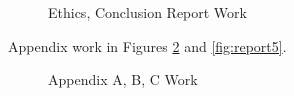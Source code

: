 \documentclass[11pt, a4, nocenter, margin=150mm]{article}
\begin{document}
\begin{appendices}
	\begin{figure}[h!]
		\centering
		\caption{Ethics, Conclusion Report Work}
		\label{fig:report3}
	\end{figure}

	Appendix work in Figures \ref{fig:report4} and \ref{fig:report5}.

	\begin{figure}[h!]
		\centering
		\caption{Appendix A, B, C Work}
		\label{fig:report4}
	\end{figure}


\end{appendices}
\end{document}

